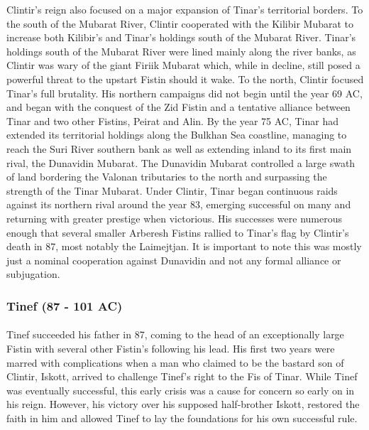 Clintir's reign also focused on a major expansion of Tinar's territorial borders. To the south of the Mubarat River, Clintir cooperated with the Kilibir Mubarat to increase both Kilibir's and Tinar's holdings south of the Mubarat River. Tinar's holdings south of the Mubarat River were lined mainly along the river banks, as Clintir was wary of the giant Firiik Mubarat which, while in decline, still posed a powerful threat to the upstart Fistin should it wake. To the north, Clintir focused Tinar's full brutality. His northern campaigns did not begin until the year 69 AC, and began with the conquest of the Zid Fistin and a tentative alliance between Tinar and two other Fistins, Peirat and Alin. By the year 75 AC, Tinar had extended its territorial holdings along the Bulkhan Sea coastline, managing to reach the Suri River southern bank as well as extending inland to its first main rival, the Dunavidin Mubarat. The Dunavidin Mubarat controlled a large swath of land bordering the Valonan tributaries to the north and surpassing the strength of the Tinar Mubarat. Under Clintir, Tinar began continuous raids against its northern rival around the year 83, emerging successful on many and returning with greater prestige when victorious. His successes were numerous enough that several smaller Arberesh Fistins rallied to Tinar's flag by Clintir's death in 87, most notably the Laimejtjan. It is important to note this was mostly just a nominal cooperation against Dunavidin and not any formal alliance or subjugation.
\subsubsection{Tinef (87 - 101 AC)}
\paragraph{}
Tinef succeeded his father in 87, coming to the head of an exceptionally large Fistin with several other Fistin's following his lead. His first two years were marred with complications when a man who claimed to be the bastard son of Clintir, Iskott, arrived to challenge Tinef's right to the Fis of Tinar. While Tinef was eventually successful, this early crisis was a cause for concern so early on in his reign. However, his victory over his supposed half-brother Iskott, restored the faith in him and allowed Tinef to lay the foundations for his own successful rule.

